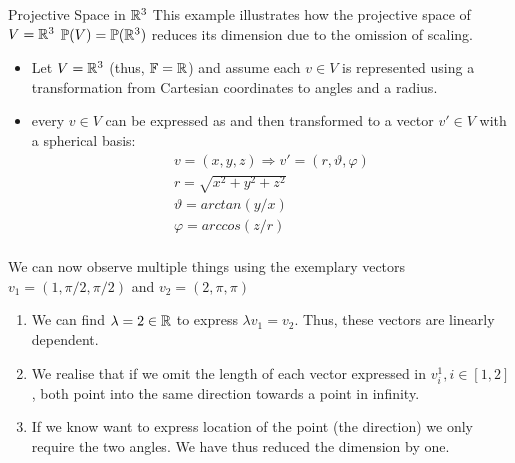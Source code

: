 \begin{exampleBox}{Projective Space in $\mathbb{R}^3$}
    This example illustrates how the projective space of $V = \mathbb{R}^3$ $\mathbb{P}(V) = \mathbb{P}(\mathbb{R}^3)$ reduces its dimension due to the omission of scaling.
    \begin{itemize}
        \item Let $V = \mathbb{R}^3$ (thus, $\mathbb{F} = \mathbb{R}$) and assume each $v \in V$ is represented using a transformation from Cartesian coordinates to angles and a radius.
        \item every $v \in V$ can be expressed as and then transformed to a vector $v' \in V$ with a spherical basis: 
            \begin{gather*}
                v = (x,y,z) \Rightarrow v' =  (r, \vartheta,\varphi)  \\
                r = \sqrt{x^2+y^2+z^2} \\
                \vartheta = arctan(y/x) \\
                \varphi = arccos(z/r) \\   
            \end{gather*}
    \end{itemize}  
    
    We can now observe multiple things using the exemplary vectors $v_1 = (1, \pi/2,\pi/2)$ and $v_2 = (2, \pi,\pi)$
    \begin{enumerate}
        \item We can find $\lambda = 2 \in \mathbb{R}$ to express $\lambda v_1 = v_2$. Thus, these vectors are linearly dependent.
        \item We realise that if we omit the length of each vector expressed in $v_i^1, i \in [1,2]$, both point into the same direction towards a point in infinity.
        \item If we know want to express location of the point (the direction) we only require the two angles. We have thus reduced the dimension by one.
    \end{enumerate}
    
\end{exampleBox}

